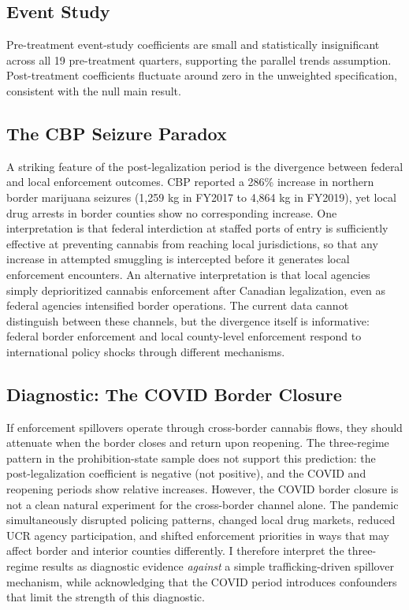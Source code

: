 \documentclass[12pt]{article}
\begin{document}
\subsection{Event Study}

Pre-treatment event-study coefficients are small and statistically insignificant across all 19 pre-treatment quarters, supporting the parallel trends assumption. Post-treatment coefficients fluctuate around zero in the unweighted specification, consistent with the null main result.

\subsection{The CBP Seizure Paradox}

A striking feature of the post-legalization period is the divergence between federal and local enforcement outcomes. CBP reported a 286\% increase in northern border marijuana seizures (1,259 kg in FY2017 to 4,864 kg in FY2019), yet local drug arrests in border counties show no corresponding increase. One interpretation is that federal interdiction at staffed ports of entry is sufficiently effective at preventing cannabis from reaching local jurisdictions, so that any increase in attempted smuggling is intercepted before it generates local enforcement encounters. An alternative interpretation is that local agencies simply deprioritized cannabis enforcement after Canadian legalization, even as federal agencies intensified border operations. The current data cannot distinguish between these channels, but the divergence itself is informative: federal border enforcement and local county-level enforcement respond to international policy shocks through different mechanisms.

\subsection{Diagnostic: The COVID Border Closure}

If enforcement spillovers operate through cross-border cannabis flows, they should attenuate when the border closes and return upon reopening. The three-regime pattern in the prohibition-state sample does not support this prediction: the post-legalization coefficient is negative (not positive), and the COVID and reopening periods show relative increases. However, the COVID border closure is not a clean natural experiment for the cross-border channel alone. The pandemic simultaneously disrupted policing patterns, changed local drug markets, reduced UCR agency participation, and shifted enforcement priorities in ways that may affect border and interior counties differently. I therefore interpret the three-regime results as diagnostic evidence \textit{against} a simple trafficking-driven spillover mechanism, while acknowledging that the COVID period introduces confounders that limit the strength of this diagnostic.
\end{document}
